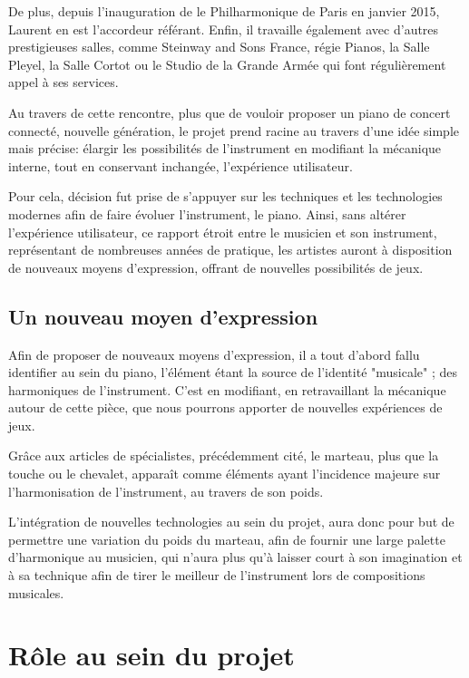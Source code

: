 \documentclass[french,a4paper,12pt]{report}
\begin{document}
	De plus, depuis l'inauguration de le Philharmonique de Paris en janvier 2015, Laurent en est l'accordeur référant. Enfin, il travaille également avec d'autres prestigieuses salles, comme Steinway and Sons France, régie Pianos, la Salle Pleyel, la Salle Cortot ou le Studio de la Grande Armée qui font régulièrement appel à ses services.	
	
	Au travers de cette rencontre, plus que de vouloir proposer un piano de concert connecté, nouvelle génération, le projet prend racine au travers d'une idée simple mais précise: élargir les possibilités de l'instrument en modifiant la mécanique interne, tout en conservant inchangée, l'expérience utilisateur.
	
	Pour cela, décision fut prise de s'appuyer sur les techniques et les technologies modernes afin de faire évoluer l'instrument, le piano.	Ainsi, sans altérer l'expérience utilisateur, ce rapport étroit entre le musicien et son instrument, représentant de nombreuses années de pratique, les artistes auront à disposition de nouveaux moyens d'expression, offrant de nouvelles possibilités de jeux.
	
	\newpage
	
		\subsection{Un nouveau moyen d'expression} %
		
		Afin de proposer de nouveaux moyens d'expression, il a tout d'abord fallu identifier au sein du piano, l'élément étant la source de l'identité "musicale" ; des harmoniques de l'instrument. C'est en modifiant, en retravaillant la mécanique autour de cette pièce, que nous pourrons apporter de nouvelles expériences de jeux.
		
		Grâce aux articles de spécialistes, précédemment cité, le marteau, plus que la touche ou le chevalet, apparaît comme éléments ayant l'incidence majeure sur l'harmonisation de l'instrument, au travers de son poids.
		
		L'intégration de nouvelles technologies au sein du projet, aura donc pour but de permettre une variation du poids du marteau, afin de fournir une large palette d'harmonique au musicien, qui n'aura plus qu'à laisser court à son imagination et à sa technique afin de tirer le meilleur de l'instrument lors de compositions musicales.
	
	\section{Rôle au sein du projet}	
	
\end{document}
